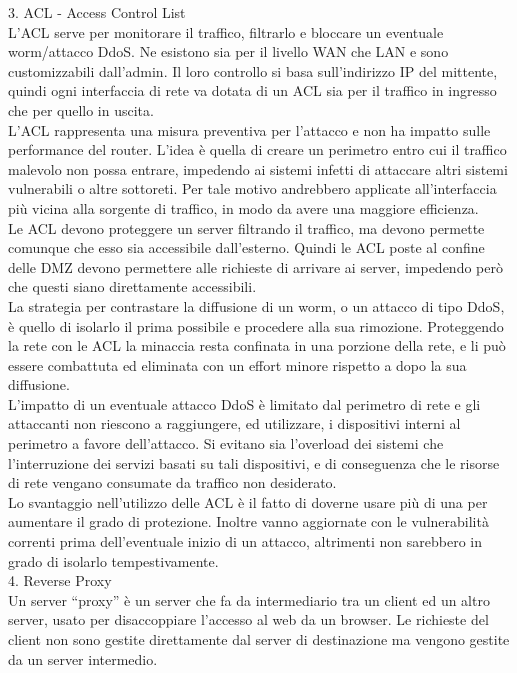 3. ACL - Access Control List\\
L’ACL serve per monitorare il traffico, filtrarlo e bloccare un eventuale worm/attacco DdoS. Ne esistono sia per il livello WAN che LAN e sono customizzabili dall’admin. Il loro controllo si basa sull’indirizzo IP del mittente, quindi ogni interfaccia di rete va dotata di un ACL sia per il traffico in ingresso che per quello in uscita.\\
L’ACL rappresenta una misura preventiva per l’attacco e non ha impatto sulle performance del router. L’idea è quella di creare un perimetro entro cui il traffico malevolo non possa entrare, impedendo ai sistemi infetti di attaccare altri sistemi vulnerabili o altre sottoreti. Per tale motivo andrebbero applicate all’interfaccia più vicina alla sorgente di traffico, in modo da avere una maggiore efficienza.\\

Le ACL devono proteggere un server filtrando il traffico, ma devono permette comunque che esso sia accessibile dall’esterno. Quindi le ACL poste al confine delle DMZ devono permettere alle richieste di arrivare ai server, impedendo però che questi siano direttamente accessibili.\\

La strategia per contrastare la diffusione di un worm, o un attacco di tipo DdoS, è quello di isolarlo il prima possibile e procedere alla sua rimozione. Proteggendo la rete con le ACL la minaccia resta confinata in una porzione della rete, e li può essere combattuta ed eliminata con un effort minore rispetto a dopo la sua diffusione.\\

L’impatto di un eventuale attacco DdoS è limitato dal perimetro di rete e gli attaccanti non riescono a raggiungere, ed utilizzare, i dispositivi interni al perimetro a favore dell’attacco. Si evitano sia l’overload dei sistemi che l’interruzione dei servizi basati su tali dispositivi, e di conseguenza che le risorse di rete vengano consumate da traffico non desiderato.\\

Lo svantaggio nell’utilizzo delle ACL è il fatto di doverne usare più di una per aumentare il grado di protezione. Inoltre vanno aggiornate con le vulnerabilità correnti prima dell’eventuale inizio di un attacco, altrimenti non sarebbero in grado di isolarlo tempestivamente.\\


4. Reverse Proxy\\
Un server “proxy” è un server che fa da intermediario tra un client ed un altro server, usato per disaccoppiare l’accesso al web da un browser. Le richieste del client non sono gestite direttamente dal server di destinazione ma vengono gestite da un server intermedio.\\

